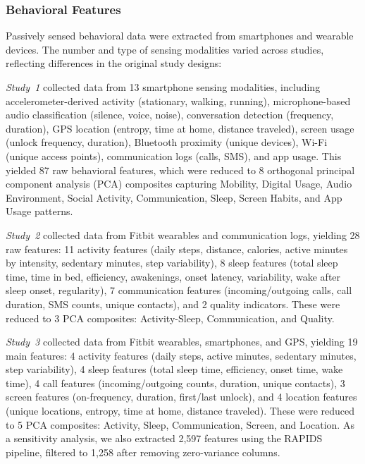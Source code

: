 \documentclass[12pt, a4paper]{article}
\begin{document}
\subsubsection{Behavioral Features}

Passively sensed behavioral data were extracted from smartphones and wearable devices. The number and type of sensing modalities varied across studies, reflecting differences in the original study designs:

\textit{Study~1} collected data from 13 smartphone sensing modalities, including accelerometer-derived activity (stationary, walking, running), microphone-based audio classification (silence, voice, noise), conversation detection (frequency, duration), GPS location (entropy, time at home, distance traveled), screen usage (unlock frequency, duration), Bluetooth proximity (unique devices), Wi-Fi (unique access points), communication logs (calls, SMS), and app usage. This yielded 87 raw behavioral features, which were reduced to 8 orthogonal principal component analysis (PCA) composites capturing Mobility, Digital Usage, Audio Environment, Social Activity, Communication, Sleep, Screen Habits, and App Usage patterns.

\textit{Study~2} collected data from Fitbit wearables and communication logs, yielding 28 raw features: 11 activity features (daily steps, distance, calories, active minutes by intensity, sedentary minutes, step variability), 8 sleep features (total sleep time, time in bed, efficiency, awakenings, onset latency, variability, wake after sleep onset, regularity), 7 communication features (incoming/outgoing calls, call duration, SMS counts, unique contacts), and 2 quality indicators. These were reduced to 3 PCA composites: Activity-Sleep, Communication, and Quality.

\textit{Study~3} collected data from Fitbit wearables, smartphones, and GPS, yielding 19 main features: 4 activity features (daily steps, active minutes, sedentary minutes, step variability), 4 sleep features (total sleep time, efficiency, onset time, wake time), 4 call features (incoming/outgoing counts, duration, unique contacts), 3 screen features (on-frequency, duration, first/last unlock), and 4 location features (unique locations, entropy, time at home, distance traveled). These were reduced to 5 PCA composites: Activity, Sleep, Communication, Screen, and Location. As a sensitivity analysis, we also extracted 2,597 features using the RAPIDS pipeline, filtered to 1,258 after removing zero-variance columns.
\end{document}
